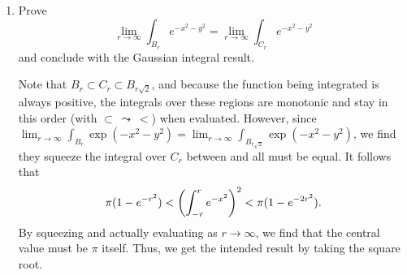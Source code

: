 \documentclass{article}
\begin{document}
\begin{enumerate}[start=1,label={(\alph*)}]
  \item Prove
        \[ \lim_{r \to \infty}\int_{B_{r}} e^{-x^{2}-y^{2}} = \lim_{r \to \infty} \int_{C_{r}} e^{-x^{2}-y^{2}} \]
        and conclude with the Gaussian integral result.

        Note that $B_{r} \subset C_{r} \subset B_{r\sqrt{2}}$, and because the function being integrated is always positive,
        the integrals over these regions are monotonic and stay in this order (with $\subset\ \leadsto\ <$) when evaluated.
        However, since $\lim_{r\to\infty}\int_{B_{r}} \exp(-x^{2}-y^{2}) = \lim_{r \to \infty}\int_{B_{r\sqrt{2}}} \exp(-x^{2} - y^{2})$,
        we find they squeeze the integral over $C_{r}$ between and all must be equal.
        It follows that
        \[ \pi(1 - e^{-r^{2}}) < \pars*{\int_{-r}^{r}e^{-x^{2}}}^{2} < \pi(1 - e^{-2r^{2}}). \]
        By squeezing and actually evaluating as $r \to \infty$, we find that the central value must be $\pi$ itself.
        Thus, we get the intended result by taking the square root.
\end{enumerate}
\end{document}
